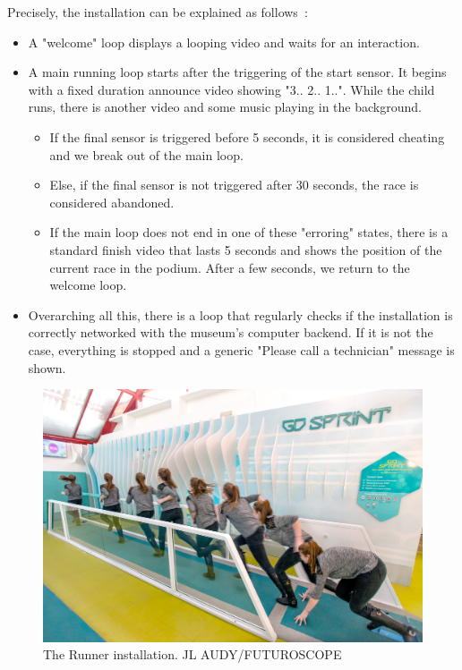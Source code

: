 \documentclass{sigchi}
\begin{document}
Precisely, the installation can be explained as follows~: 
\begin{itemize}
    \item A "welcome" loop displays a looping video and waits for an interaction.
    \item A main running loop starts after the triggering of the start sensor. It begins with a fixed duration announce video showing "3.. 2.. 1..". While the child runs, there is another video and some music playing in the background. 
    \begin{itemize}
    	\item If the final sensor is triggered before 5 seconds, it is considered cheating and we break out of the main loop.    	
    	\item Else, if the final sensor is not triggered after 30 seconds, the race is considered abandoned.     	
    	\item If the main loop does not end in one of these "erroring" states, there is a standard finish video that lasts 5 seconds and shows the position of the current race in the podium. After a few seconds, we return to the welcome loop.
    \end{itemize}    
    \item Overarching all this, there is a loop that regularly checks if the installation is correctly networked with the museum's computer backend. If it is not the case, everything is stopped and a generic "Please call a technician" message is shown.
\end{itemize}

\begin{figure}
    \centering
    \includegraphics[scale=0.6]{images/futuroscope.jpg}
    \caption{The Runner installation. \tiny{\textcopyright JL AUDY/FUTUROSCOPE}}
    \label{fig.futuroscope}
\end{figure}
\end{document}
